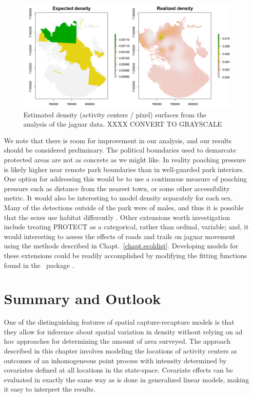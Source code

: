 \begin{figure}%
\centering
\includegraphics[width=\textwidth]{Ch11-Statespace/figs/reD}
\caption{Estimated density (activity centers / pixel) surfaces from
  the analysis of the jaguar data. XXXX CONVERT TO GRAYSCALE}
\label{state-space.fig.Dsurface}
\end{figure}

We note that there is room for improvement in our analysis, and our
results should be considered preliminary. The
political boundaries used to demarcate protected areas are not as
concrete as we might like. In reality poaching pressure is likely
higher near remote park boundaries than in well-guarded park
interiors. One option for addressing this would be to use a continuous
measure of poaching pressure such as distance from the nearest town,
or some other accessibility metric. It would also be interesting to
model density separately for each sex. Many of the detections outside
of the park were of males, and thus it is possible that the sexes use
habitat differently \citep{conde_etal:2010}. Other extensions worth
investigation include treating PROTECT as a categorical, rather than
ordinal, variable; and, it would interesting to assess the effects of
roads and trails on jaguar movement using the methods described in
Chapt.~\ref{chapt.ecoldist}. Developing models for these extensions
could be readily accomplished by modifying the fitting functions found
in the \R~package \scrbook.



\section{Summary and Outlook}

One of the distinguishing features of spatial capture-recapture models
is that they allow for inference about spatial variation
in density without relying on ad hoc approaches for determining the
amount of area surveyed. The approach described
in this chapter involves modeling the locations of activity centers as outcomes
of an inhomogeneous point process with intensity determined by
covariates defined at all locations in the state-space. Covariate
effects can be evaluated in exactly the same way as is done in
generalized linear models, making it easy to interpret the results.

